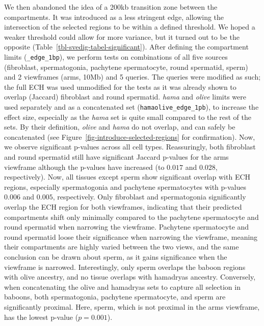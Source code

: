 \documentclass[
  11pt,
  a4paper,
]{scrbook}
\let\oldemph\emph
\renewcommand\emph[1]{\oldemph{\color{gray}#1}}
\begin{document}
We then abandoned the idea of a 200kb transition zone between the
compartments. It was introduced as a less stringent edge, allowing the
intersection of the selected regions to be within a defined threshold.
We hoped a weaker threshold could allow for more variance, but it turned
out to be the opposite (Table~\ref{tbl-svedig-tabel-significant}). After
defining the compartment limits (\texttt{\_edge\_1bp}), we perform tests
on combinations of all five sources (fibroblast, spermatogonia,
pachytene spermatocyte, round spermatid, sperm) and 2 viewframes (arms,
10Mb) and 5 queries. The queries were modified as such; the full ECH was
used unmodified for the tests as it was already shown to overlap
(Jaccard) fibroblast and round spermatid. \emph{hama} and \emph{olive}
limits were used separately and as a concatenated set
(\texttt{hamaolive\_edge\_1pb}), to increase the effect size, especially
as the \emph{hama} set is quite small compared to the rest of the sets.
By their definition, \emph{olive} and \emph{hama} do not overlap, and
can safely be concatenated (see
Figure~\ref{fig-introduce-selected-regions} for confirmation). Now, we
observe significant p-values across all cell types. Reassuringly, both
fibroblast and round spermatid still have significant Jaccard p-values
for the arms viewframe although the p-values have increased (to
\(0.017\) and \(0.028\), respectively). Now, all tissues except sperm
show significant overlap with ECH regions, especially spermatogonia and
pachytene spermatocytes with p-values \(0.006\) and \(0.005\),
respectively. Only fibroblast and spermatogonia significantly overlap
the ECH region for both viewframes, indicating that their predicted
compartments shift only minimally compared to the pachytene spermatocyte
and round spermatid when narrowing the viewframe. Pachytene spermatocyte
and round spermatid loose their significance when narrowing the
viewframe, meaning their compartments are highly varied between the two
views, and the same conclusion can be drawn about sperm, as it gains
significance when the viewframe is narrowed. Interestingly, only sperm
overlaps the baboon regions with olive ancestry, and no tissue overlaps
with hamadryas ancestry. Conversely, when concatenating the olive and
hamadryas sets to capture all selection in baboons, both spermatogonia,
pachytene spermatocyte, and sperm are significantly proximal. Here,
sperm, which is not proximal in the arms viewframe, has the lowest
p-value (\(p=0.001\)).

\scriptsize
\end{document}
